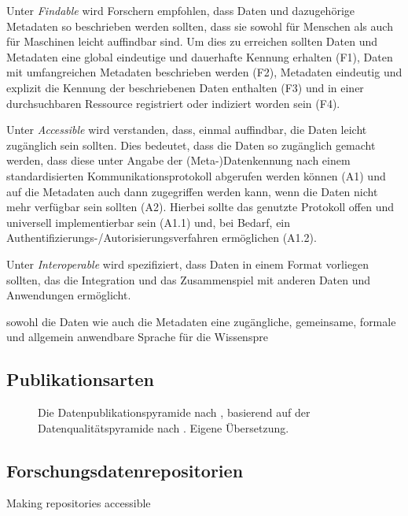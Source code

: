Unter \textit{Findable} wird Forschern empfohlen, dass Daten und dazugehörige Metadaten so beschrieben werden sollten, dass sie sowohl für Menschen als auch für Maschinen leicht auffindbar sind.
Um dies zu erreichen sollten Daten und Metadaten eine global eindeutige und dauerhafte Kennung erhalten (F1), Daten mit umfangreichen Metadaten beschrieben werden (F2), Metadaten eindeutig und explizit die Kennung der beschriebenen Daten enthalten (F3) und in einer durchsuchbaren Ressource registriert oder indiziert worden sein (F4).

Unter \textit{Accessible} wird verstanden, dass, einmal auffindbar, die Daten leicht zugänglich sein sollten.
Dies bedeutet, dass die Daten so zugänglich gemacht werden, dass diese unter Angabe der (Meta-)Datenkennung nach einem standardisierten Kommunikationsprotokoll abgerufen werden können (A1) und auf die Metadaten auch dann zugegriffen werden kann, wenn die Daten nicht mehr verfügbar sein sollten (A2).
Hierbei sollte das genutzte Protokoll offen und universell implementierbar sein (A1.1) und, bei Bedarf, ein Authentifizierungs-/Autorisierungsverfahren ermöglichen (A1.2).

Unter \textit{Interoperable} wird spezifiziert, dass Daten in einem Format vorliegen sollten, das die Integration und das Zusammenspiel mit anderen Daten und Anwendungen ermöglicht.


sowohl die Daten wie auch die Metadaten eine zugängliche, gemeinsame, formale und allgemein anwendbare Sprache für die Wissenspre


\subsection{Publikationsarten}\label{sec:forschungsstand-basics-publicationtypes}
\autocite{ReillyEtAl2011}
\begin{figure}[!htbp]
    \centering
    \resizebox{.8\textwidth}{!}{}
    \caption{Die Datenpublikationspyramide nach \citeauthor{ReillyEtAl2011} \autocite{ReillyEtAl2011}, basierend auf der Datenqualitätspyramide nach \citeauthor{Gray2009} \autocite{Gray2009}. Eigene Übersetzung.}
    \label{fig:data-pyramid}
\end{figure}

\subsection{Forschungsdatenrepositorien}\label{sec:forschungsstand-basics-repositories}
Making repositories accessible \autocite{Pampel2013}

